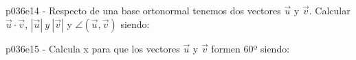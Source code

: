 \documentclass[spanish, 11pt]{exam}
\begin{document}
\begin{questions}
\begin{multicols}{2}
        \end{multicols}
        \question p036e14 - Respecto de una base ortonormal tenemos dos vectores $\overrightarrow{u}$ y $\overrightarrow{v}$.
Calcular $\overrightarrow{u}\cdot\overrightarrow{v}$, $|\overrightarrow{u}| \ y \ |\overrightarrow{v}|$ 
y $\angle(\overrightarrow{u},\overrightarrow{v})$ siendo:
        \begin{multicols}{2} 
        \end{multicols}
        \question p036e15 - Calcula x para que los vectores
$\overrightarrow{u}$ y $\overrightarrow{v}$ formen 60º siendo: 
        \begin{multicols}{2} 

\end{multicols}
\end{questions}
\end{document}
